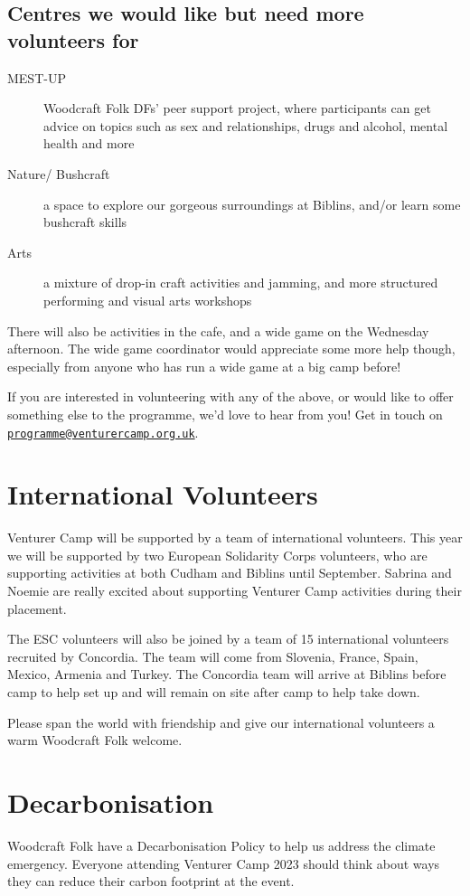\documentclass[a4paper, 11pt]{report}
\newcommand{\nl}{\newline}
\begin{document}
\section{Centres we would like but need more volunteers for}
\begin{description}
    \item[MEST-UP] Woodcraft Folk DFs' peer support project, where participants can get advice on topics such as sex and relationships, drugs and alcohol, mental health and more
    \item[Nature/ Bushcraft] a space to explore our gorgeous surroundings at Biblins, and/or learn some bushcraft skills
    \item[Arts]  a mixture of drop-in craft activities and jamming, and more structured performing and visual arts workshops 
\end{description}

There will also be activities in the cafe, and a wide game on the Wednesday afternoon. The wide game coordinator would appreciate some more help though, especially from anyone who has run a wide game at a big camp before!\nl 

If you are interested in volunteering with any of the above, or would like to offer something else to the programme, we'd love to hear from you! Get in touch on 
\href{mailto:programme@venturercamp.org.uk}{\texttt{programme@venturercamp.org.uk}}.

\chapter{International Volunteers}
Venturer Camp will be supported by a team of international volunteers. This year we will be supported by two European Solidarity Corps volunteers, who are supporting activities at both Cudham and Biblins until September. Sabrina and Noemie are really excited about supporting Venturer Camp activities during their placement.\nl

The ESC volunteers will also be joined by a team of 15 international volunteers recruited by Concordia. The team will come from Slovenia, France, Spain, Mexico, Armenia and Turkey. The Concordia team will arrive at Biblins before camp to help set up and will remain on site after camp to help take down.\nl

Please span the world with friendship and give our international volunteers a warm Woodcraft Folk welcome.

\chapter{Decarbonisation}
Woodcraft Folk have a Decarbonisation Policy to help us address the climate emergency. Everyone attending Venturer Camp 2023 should think about ways they can reduce their carbon footprint at the event. 
\end{document}
